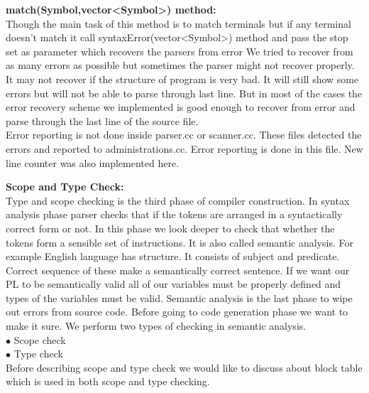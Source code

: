 \documentclass[paper=letter, fontsize=12pt]{scrartcl} %
\begin{document}
{\bf match(Symbol,vector<Symbol>) method:}\\
Though the main task of this method is to match terminals but if any terminal doesn't match it call syntaxError(vector<Symbol>) method and pass the stop set as parameter which recovers the parsers from error		
We tried to recover from as many errors as possible but sometimes the parser might not recover properly. It may not recover if the structure of program is very bad. It will still show some errors but will not be able to parse through last line. But in most of the cases the error recovery scheme we implemented is good enough to recover from error and parse through the last line of the source file.\\

Error reporting is not done inside parser.cc or scanner.cc. These files detected the errors and reported to administrations.cc. Error reporting is done in this file. New line counter was also implemented here.\\

\pagebreak


{\bf {\huge Scope and Type Check:}}\\
Type and scope checking is the third phase of compiler construction. In syntax analysis phase parser checks that if the tokens are arranged in a syntactically correct form or not. In this phase we look deeper to check that whether the tokens form a sensible set of instructions. It is also called semantic analysis. For example English language has structure. It consists of subject and predicate. Correct sequence of these make a semantically correct sentence. If we want our PL to be semantically valid all of our variables must be properly defined and types of the variables must be valid. Semantic analysis is the last phase to wipe out errors from source code. Before going to code generation phase we want to make it sure. We perform two types of checking in semantic analysis.\\

$\bullet$ Scope check\\
$\bullet$ Type check\\

Before describing scope and type check we would like to discuss about block table which is used in both scope and type checking.\\
\end{document}
